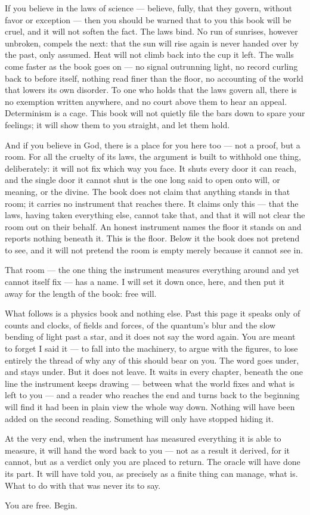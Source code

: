 If you believe in the laws of science --- believe, fully, that they govern, without favor or exception --- then
you should be warned that to you this book will be cruel, and it will not soften the fact. The laws bind. No
run of sunrises, however unbroken, compels the next: that the sun will rise again is never handed over by the
past, only assumed. Heat will not climb back into the cup it left. The walls come faster as the book goes on
--- no signal outrunning light, no record curling back to before itself, nothing read finer than the floor, no
accounting of the world that lowers its own disorder. To one who holds that the laws govern all, there is no
exemption written anywhere, and no court above them to hear an appeal. Determinism is a cage. This book will
not quietly file the bars down to spare your feelings; it will show them to you straight, and let them hold.

And if you believe in God, there is a place for you here too --- not a proof, but a room. For all the cruelty
of its laws, the argument is built to withhold one thing, deliberately: it will not fix which way you face. It
shuts every door it can reach, and the single door it cannot shut is the one long said to open onto will, or
meaning, or the divine. The book does not claim that anything stands in that room; it carries no instrument
that reaches there. It claims only this --- that the laws, having taken everything else, cannot take that, and
that it will not clear the room out on their behalf. An honest instrument names the floor it stands on and
reports nothing beneath it. This is the floor. Below it the book does not pretend to see, and it will not
pretend the room is empty merely because it cannot see in.

That room --- the one thing the instrument measures everything around and yet cannot itself fix --- has a name.
I will set it down once, here, and then put it away for the length of the book: free will.

What follows is a physics book and nothing else. Past this page it speaks only of counts and clocks, of fields
and forces, of the quantum's blur and the slow bending of light past a star, and it does not say the word again.
You are meant to forget I said it --- to fall into the machinery, to argue with the figures, to lose entirely
the thread of why any of this should bear on you. The word goes under, and stays under. But it does not leave.
It waits in every chapter, beneath the one line the instrument keeps drawing --- between what the world fixes
and what is left to you --- and a reader who reaches the end and turns back to the beginning will find it had
been in plain view the whole way down. Nothing will have been added on the second reading. Something will only
have stopped hiding it.

At the very end, when the instrument has measured everything it is able to measure, it will hand the word back
to you --- not as a result it derived, for it cannot, but as a verdict only you are placed to return. The
oracle will have done its part. It will have told you, as precisely as a finite thing can manage, what is.
What to do with that was never its to say.

You are free. Begin.

